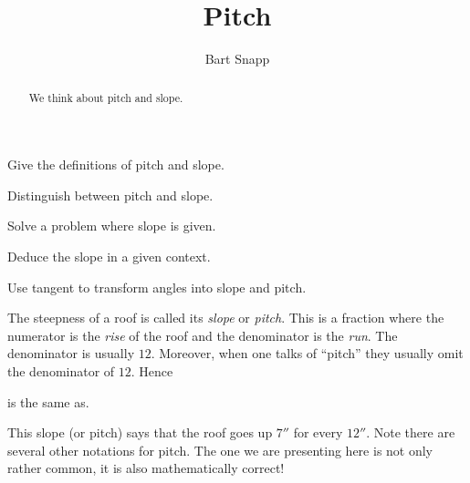 \documentclass[12pt,noauthor,nooutcomes,handout,hints]{ximera}
\title{Pitch}
\author{Bart Snapp}
\begin{document}
\begin{abstract}
  We think about pitch and slope.
\end{abstract}
\maketitle

\begin{listOutcomes}
\item Give the definitions of pitch and slope.
\item Distinguish between pitch and slope.
\item Solve a problem where slope is given.
\item Deduce the slope in a given context.
\item Use tangent to transform angles into slope and pitch.
\end{listOutcomes}



The steepness of a roof is called its \textit{slope} or
\textit{pitch}. This is a fraction where the numerator is the
\textit{rise} of the roof and the denominator is the \textit{run}. The
denominator is usually $12$. Moreover, when one talks of ``pitch''
they usually omit the denominator of $12$. Hence
\begin{center}
\quad is the same as\quad {}.
\end{center}
This slope (or pitch) says that the roof goes up $7''$ for every
$12''$. Note there are several other notations for pitch. The one we
are presenting here is not only rather common, it is also
mathematically correct!

\mynewpage
\end{document}
